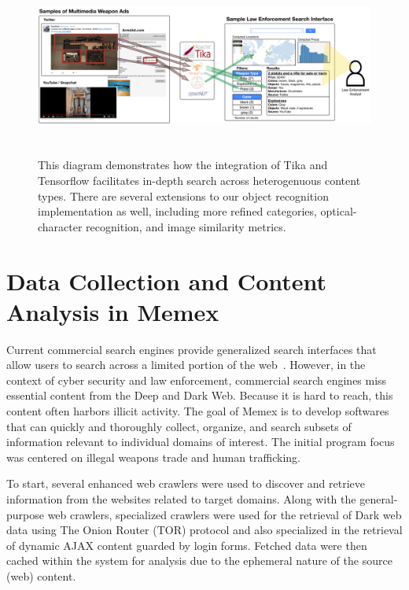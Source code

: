 \begin{figure}
	\includegraphics[width=\textwidth,height=6cm]{interface-diagram}
	\caption{This diagram demonstrates how the integration of Tika and Tensorflow facilitates in-depth search across heterogenuous content types. There are several extensions to our object recognition implementation as well, including more refined categories, optical-character recognition, and image similarity metrics.}
	\label{fig:interface-diagram}
\end{figure}

\section{Data Collection and Content Analysis in Memex}
\label{sec:memex-data}
Current commercial search engines provide generalized search interfaces that allow users to search across a limited portion of the web~\cite{}. However, in the context of cyber security and law enforcement, commercial search engines miss essential content from the Deep and Dark Web. Because it is hard to reach, this content often harbors illicit activity. The goal of Memex is to develop softwares that can quickly and thoroughly collect, organize, and search subsets of information relevant to individual domains of interest. The initial program focus was centered on illegal weapons trade and human trafficking.

To start, several enhanced web crawlers were used to discover and retrieve information from the websites related to target domains. Along with the general-purpose web crawlers, specialized crawlers were used for the retrieval of Dark web data using The Onion Router (TOR) protocol \cite{mentor2016onion} and also specialized in the retrieval of dynamic AJAX content guarded by login forms. Fetched data were then cached within the system for analysis due to the ephemeral nature of the source (web) content.

